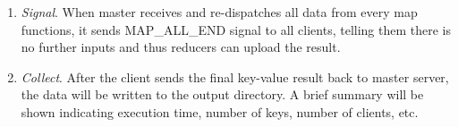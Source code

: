 \begin{enumerate}
\item \emph{Signal}. When master receives and re-dispatches all data from every map functions, it sends MAP_ALL_END signal to all clients, telling them there is no further inputs and thus reducers can upload the result.

\item \emph{Collect}. After the client sends the final key-value result back to master server, the data will be written to the output directory. A brief summary will be shown indicating execution time, number of keys, number of clients, etc.

\end{enumerate}
